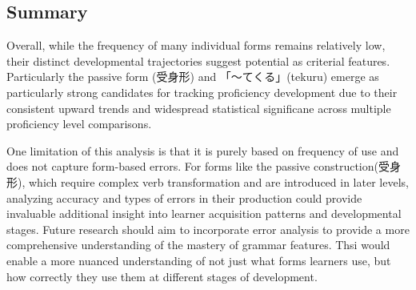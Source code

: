 \subsection{Summary}
Overall, while the frequency of many individual forms remains relatively low, their distinct developmental trajectories
suggest potential as
criterial features. Particularly the passive form (受身形) and 「〜てくる」(tekuru) emerge as particularly strong candidates
for tracking proficiency development due to their consistent upward trends and widespread statistical significane
across multiple proficiency level comparisons.

One limitation of
this analysis is that it is purely based on frequency of use and does not capture form-based errors. For forms like the
passive construction(受身形), which require complex verb transformation and are introduced in later levels, analyzing
accuracy and types of errors in their production could provide invaluable additional insight into learner
acquisition patterns and developmental stages. Future research should aim to incorporate error analysis to provide a
more comprehensive understanding of the mastery of grammar features. Thsi would enable a more nuanced understanding
of not just what forms learners use, but how correctly they use them at different stages of development.




